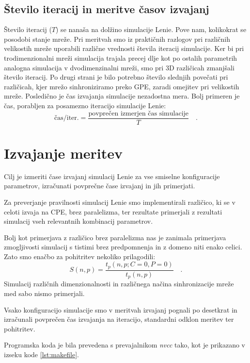 \documentclass[a4paper, 12pt, openright]{book}
\begin{document}
\subsection{Število iteracij in meritve časov izvajanj}

Število iteracij (\(T\)) se nanaša na dolžino simulacije Lenie.
Pove nam, kolikokrat se posodobi stanje mreže.
Pri meritvah smo iz praktičnih razlogov pri različnih velikostih mreže uporabili različne vrednosti števila iteracij simulacije.
Ker bi pri trodimenzionalni mreži simulacija trajala precej dlje kot po ostalih parametrih analogna simulacija v dvodimenzinalni mreži, smo pri 3D različicah zmanjšali število iteracij.
Po drugi strani je bilo potrebno število slednjih povečati pri različicah, kjer mrežo sinhroniziramo preko GPE, zaradi omejitev pri velikostih mreže.
Posledično je čas izvajanja simulacije nezadostna mera.
Bolj primeren je čas, porabljen za posamezno iteracijo simulacije Lenie:
\begin{equation}
    \text{čas/iter.} = \frac{\text{povprečen izmerjen čas simulacije}}{T}\quad.
\end{equation}

\section{Izvajanje meritev}

Cilj je izmeriti čase izvajanj simulacij Lenie za vse smiselne konfiguracije parametrov, izračunati povprečne čase izvajanj in jih primerjati.

Za preverjanje pravilnosti simulacij Lenie smo implementirali različico, ki se v celoti izvaja na CPE, brez paralelizma, ter rezultate primerjali z rezultati simulacij vseh relevantnih kombinacij parametrov.

Bolj kot primerjava z različico brez paralelizma nas je zanimala primerjava zmogljivosti simulacij s tistimi brez predpomnenja in z domeno niti enako celici. Zato smo enačbo za pohitritev nekoliko prilagodili:
\begin{equation}
    S(n, p) = \frac{t_p(n, p; C=0, P=0)}{t_p(n, p)}\quad.
\end{equation}
Simulacij različnih dimenzionalnosti in različnega načina sinhronizacije mreže med sabo nismo primerjali.

Vsako konfiguracijo simulacije smo v meritvah izvajanj pognali po desetkrat in izračunali povprečen čas izvajanja na iteracijo, standardni odklon meritev ter pohitritev.

Programska koda je bila prevedena s prevajalnikom \textit{nvcc} tako, kot je prikazano v izseku kode \ref{lst:makefile}.
\end{document}
